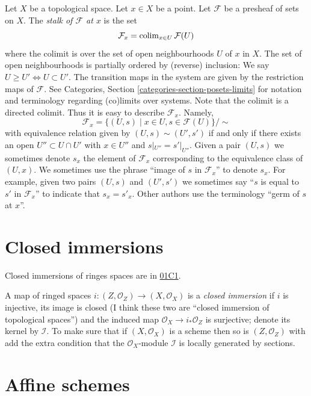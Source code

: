 \medskip\noindent
Let $X$ be a topological space. Let $x \in X$
be a point.
Let $\mathcal{F}$ be a presheaf of sets on
$X$.
The {\it stalk of $\mathcal{F}$ at $x$} is
the set
$$
\mathcal{F}_x
=
\mathop{\mathrm{colim}}\nolimits_{x\in U} \mathcal{F}(U)
$$
where the colimit is over the set of open
neighbourhoods
$U$ of $x$ in $X$. The set of open
neighbourhoods is
partially ordered by (reverse) inclusion:
We say $U \geq U' \Leftrightarrow U \subset
U'$.
The transition maps in the system are
given by the restriction maps of
$\mathcal{F}$.
See Categories, Section
\ref{categories-section-posets-limits}
for notation and terminology regarding
(co)limits over systems.
Note that the colimit is a directed colimit.
Thus it is easy to describe $\mathcal{F}_x$.
Namely,
$$
\mathcal{F}_x
=
\{
(U, s)
\mid
x\in U, s\in \mathcal{F}(U)
\}/\sim
$$
with equivalence relation given by $(U, s)
\sim (U', s')$ if and only if
there exists an open $U'' \subset U \cap U'$
with $x \in U''$ and
$s|_{U''} = s'|_{U''}$. Given a pair $(U, s)$
we sometimes denote
$s_x$ the element of $\mathcal{F}_x$
corresponding to the equivalence
class of $(U, x)$. We sometimes use the
phrase
``image of $s$ in $\mathcal{F}_x$'' to denote
$s_x$.
For example, given two pairs $(U, s)$ and
$(U', s')$ we sometimes
say ``$s$ is equal to $s'$ in
$\mathcal{F}_x$'' to indicate
that $s_x = s'_x$. Other authors use the
terminology
``germ of $s$ at $x$''.

\section{Closed immersions}
\label{section-immersions}

\noindent
Closed immersions of ringes spaces are in
\href{https://stacks.math.columbia.edu/tag/%
01C1}{01C1}.

\begin{definition}
\label{definition-closed-immersion}
A map of ringed spaces
$i:(Z,\mathcal{O}_Z) \to (X,\mathcal{O}_X)$
is a {\it closed immersion}
if $i$ is injective,
its image is closed (I think these two are
``closed immersion of topological spaces'')
and the induced map $\mathcal{O}_X \to
i_*\mathcal{O}_Z$
is surjective; denote its kernel by
$\mathcal{I}$.
To make sure that if $(X,\mathcal{O}_X)$ is a
scheme
then so is $(Z,\mathcal{O}_Z)$ with add the
extra condition
that the $\mathcal{O}_X$-module $\mathcal{I}$
is
locally generated by sections.
\end{definition}

\medskip\noindent
\section{Affine schemes}
\label{section-affine-schemes}

